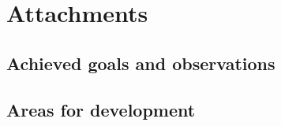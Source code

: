 
\chapter{Attachments} \label{chap:conclusions}

\section{Achieved goals and observations}


\section{Areas for development}


